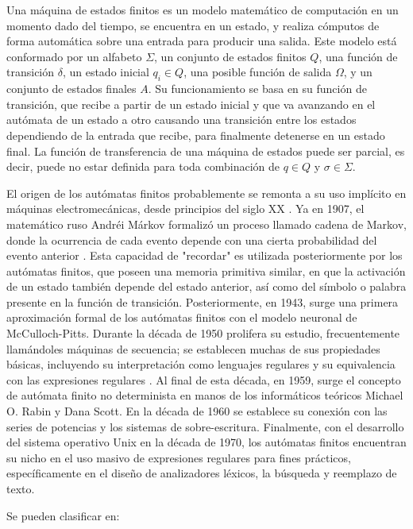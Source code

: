 \documentclass[journal,trans]{IEEEtran}
\begin{document}
	Una máquina de estados finitos es un modelo matemático de computación en un momento dado del tiempo, se encuentra en un estado, y realiza cómputos de forma automática sobre una entrada para producir una salida. Este modelo está conformado por un alfabeto $\Sigma$, un conjunto de estados finitos $Q$, una función de transición $\delta$, un estado inicial $q_{i} \in Q$, una posible función de salida $\Omega$, y un conjunto de estados finales $A$. 
	Su funcionamiento se basa en su función de transición, que recibe a partir de un estado inicial y que va avanzando en el autómata de un estado a otro causando una transición entre los estados dependiendo de la entrada que recibe, para finalmente detenerse en un estado final.
	La función de transferencia de una máquina de estados puede ser parcial, es decir, puede no estar definida para toda combinación de $q \in Q$  y $\sigma \in \Sigma$.
	
	El origen de los autómatas finitos probablemente se remonta a su uso implícito en máquinas electromecánicas, desde principios del siglo XX \cite{wolfram}.  Ya en 1907, el matemático ruso Andréi Márkov formalizó un proceso llamado cadena de Markov, donde la ocurrencia de cada evento depende con una cierta probabilidad del evento anterior \cite{vasharin} . Esta capacidad de "recordar" es utilizada posteriormente por los autómatas finitos, que poseen una memoria primitiva similar, en que la activación de un estado también depende del estado anterior, así como del símbolo o palabra presente en la función de transición.
	Posteriormente, en 1943, surge una primera aproximación formal de los autómatas finitos con el modelo neuronal de McCulloch-Pitts. Durante la década de 1950 prolifera su estudio, frecuentemente llamándoles máquinas de secuencia; se establecen muchas de sus propiedades básicas, incluyendo su interpretación como lenguajes regulares y su equivalencia con las expresiones regulares \cite{wolfram}. Al final de esta década, en 1959, surge el concepto de autómata finito no determinista en manos de los informáticos teóricos Michael O. Rabin y Dana Scott.
	En la década de 1960 se establece su conexión con las series de potencias y los sistemas de sobre-escritura. Finalmente, con el desarrollo del sistema operativo Unix en la década de 1970, los autómatas finitos encuentran su nicho en el uso masivo de expresiones regulares para fines prácticos, específicamente en el diseño de analizadores léxicos, la búsqueda y reemplazo de texto.	
	
	Se pueden clasificar en:
	
\end{document}
